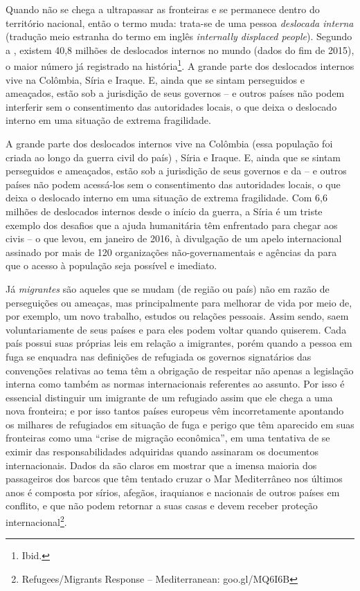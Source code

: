 Quando não se chega a ultrapassar as fronteiras e se permanece dentro do
território nacional, então o termo muda: trata-se de uma pessoa
\textit{deslocada interna} (tradução meio estranha do termo em inglês
\emph{internally displaced people}). Segundo a , existem 40,8 milhões
de deslocados internos no mundo (dados do fim de 2015), o maior número
já registrado na história\footnote{Ibid.}. A grande parte dos deslocados
internos vive na Colômbia, Síria e Iraque. E, ainda que se sintam
perseguidos e ameaçados, estão sob a jurisdição de seus governos -- e
outros países não podem interferir sem o consentimento das autoridades
locais, o que deixa o deslocado interno em uma situação de extrema
fragilidade.

A grande parte dos deslocados internos
vive na Colômbia (essa população foi criada ao longo da guerra civil do
país) , Síria e Iraque. E, ainda que se sintam perseguidos e ameaçados,
estão sob a jurisdição de seus governos e da  -- e outros países
não podem acessá-los sem o consentimento das autoridades locais, o que
deixa o deslocado interno em uma situação de extrema fragilidade. Com
6,6 milhões de deslocados internos desde o início da guerra, a Síria é
um triste exemplo dos desafios que a ajuda humanitária têm enfrentado
para chegar aos civis -- o que levou, em janeiro de 2016, à divulgação
de um apelo internacional assinado por mais de 120 organizações
não-governamentais e agências da  para que o acesso à população seja
possível e imediato.

Já \textit{migrantes} são aqueles que se mudam (de região ou país) não
em razão de perseguições ou ameaças, mas principalmente para melhorar de
vida por meio de, por exemplo, um novo trabalho, estudos ou relações
pessoais. Assim sendo, saem voluntariamente de seus países e para eles
podem voltar quando quiserem. Cada país possui suas próprias leis em
relação a imigrantes, porém quando a pessoa em fuga se enquadra nas
definições de refugiada os governos signatários das convenções relativas
ao tema têm a obrigação de respeitar não apenas a legislação interna
como também as normas internacionais referentes ao assunto. Por isso é
essencial distinguir um imigrante de um refugiado assim que ele chega a
uma nova fronteira; e por isso tantos países europeus vêm incorretamente
apontando os milhares de refugiados em situação de fuga e perigo que têm
aparecido em suas fronteiras como uma ``crise de migração econômica'',
em uma tentativa de se eximir das responsabilidades adquiridas quando
assinaram os documentos internacionais. Dados da  são claros em
mostrar que a imensa maioria dos passageiros dos barcos que têm tentado
cruzar o Mar Mediterrâneo nos últimos anos é composta por sírios,
afegãos, iraquianos e nacionais de outros países em conflito, e que não
podem retornar a suas casas e devem receber proteção internacional\footnote{Refugees/Migrants Response -- 
Mediterranean: goo.gl/MQ6I6B}.




